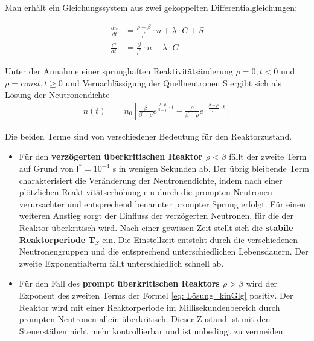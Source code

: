 	Man erhält ein Gleichungssystem aus zwei gekoppelten Differentialgleichungen:
	
	\begin{align}
	\frac{dn}{dt}&= \frac{\rho - \beta}{l^{*}} \cdot n + \lambda \cdot C + S\\
	\frac{C}{dt}&= \frac{\beta}{l^{*}} \cdot n - \lambda \cdot C
	\end{align}
	
	Unter der Annahme einer sprunghaften Reaktivitätsänderung $\rho = 0, t<0$ und $\rho = const, t\geq 0$ und Vernachlässigung der Quellneutronen S ergibt sich als Lösung der Neutronendichte
	\begin{align}
	n(t)&= n_{0} \left[ \frac{\beta}{\beta - \rho} e^{\frac{\lambda \cdot \rho}{\beta - \rho}\cdot t} - \frac{\rho}{\beta - \rho} e^{-\frac{\beta - \rho}{l^{*}} \cdot t} \right] \label{eq: Lösung_kinGlg}
	\end{align}
	
	Die beiden Terme sind von verschiedener Bedeutung für den Reaktorzustand.
	\begin{itemize}
	\item Für den \textbf{verzögerten überkritischen Reaktor $\rho < \beta$} fällt der zweite Term auf Grund von l$ ^{*} = 10^{-4}$ s in wenigen Sekunden ab. Der übrig bleibende Term charakterisiert die Veränderung der Neutronendichte, indem nach einer plötzlichen Reaktivitätserhöhung ein durch die prompten Neutronen verursachter und entsprechend benannter prompter Sprung erfolgt. Für einen weiteren Anstieg sorgt der Einfluss der verzögerten Neutronen, für die der Reaktor überkritisch wird. Nach einer gewissen Zeit stellt sich die \textbf{stabile Reaktorperiode T$ _{S}$} ein. Die Einstellzeit entsteht durch die verschiedenen Neutronengruppen und die entsprechend unterschiedlichen Lebensdauern. Der zweite Exponentialterm fällt unterschiedlich schnell ab.
	\item Für den Fall des \textbf{prompt überkritischen Reaktors $\rho > \beta$} wird der Exponent des zweiten Terms der Formel \ref{eq: Lösung_kinGlg} positiv. Der Reaktor wird mit einer Reaktorperiode im Millisekundenbereich durch prompten Neutronen allein überkritisch. Dieser Zustand ist mit den Steuerstäben nicht mehr kontrollierbar und ist unbedingt zu vermeiden.
	\end{itemize}
	
